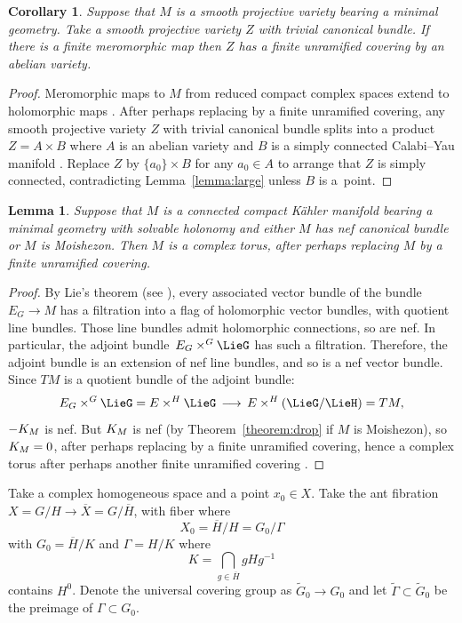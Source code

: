 \documentclass[11pt]{article}
\numberwithin{equation}{section}
\numberwithin{equation}{section}
\newtheorem{Corollary}[Theorem]{Corollary}
\newtheorem{Lemma}[Theorem]{Lemma}
\newcommand{\GZ}{G_0}
\newcommand{\tGZ}{\widetilde{G}_0}
\begin{document}
\begin{Corollary}\label{corollary:tori}
Suppose that $M$ is a smooth projective variety bearing a minimal geometry.
Take a smooth projective variety $Z$ with trivial canonical bundle.
If there is a finite meromorphic map  then $Z$ has a finite unramified covering by an abelian variety.
\end{Corollary}

\begin{proof}
Meromorphic maps to $M$ from reduced compact complex spaces extend to holomorphic maps \cite[Lemma 26]{Biswas.McKay:2016}.
After perhaps replacing by a finite unramified covering, any smooth projective variety $Z$ with trivial canonical bundle splits into a product $Z=A \times B$ where $A$ is an abelian variety and $B$ is a simply connected Calabi--Yau manifold \cite{Bogomolov:1974}.
Replace $Z$ by $\{a_0\} \times B$ for any $a_0 \in A$ to arrange that $Z$ is simply connected, contradicting
Lemma~\ref{lemma:large} unless $B$ is a~point.
\end{proof}

\begin{Lemma}\label{lemma:solvable.nef}
Suppose that $M$ is a connected compact K\"ahler manifold bearing a minimal geometry with solvable holonomy and either $M$ has nef canonical bundle or $M$ is Moishezon.
Then $M$ is a complex torus, after perhaps replacing $M$ by a finite unramified covering.
\end{Lemma}

\begin{proof}
By Lie's theorem (see \cite[Theorem 3]{Serre:2001}), every associated vector bundle of the bundle $E_G \to M$ has a filtration into a flag of holomorphic vector bundles, with quotient line bundles.
Those line bundles admit holomorphic connections, so are nef.
In particular, the adjoint bundle~$E_G \times^G \LieG$ has such a filtration.
Therefore, the adjoint bundle is an extension of nef line bundles, and so is a nef vector bundle.
Since $TM$ is a quotient bundle of the adjoint bundle:
\[
E_G \times^G \LieG = E \times^H \LieG \to E \times^H \pr{\LieG/\LieH} = TM,
\]
$\acb{M}$ is nef.
But $\cb{M}$ is nef (by Theorem~\ref{theorem:drop} if $M$ is Moishezon), so $\cb{M} = 0$, after perhaps replacing by a finite unramified covering, hence a complex torus after perhaps another finite unramified covering \cite{Biswas.McKay:2010}.
\end{proof}

Take a complex homogeneous space  and a point $x_0 \in X$.
Take the ant fibration $X = G/H \to \overline{X} = G/\overline{H}$, with fiber \pr{X_0,\GZ} where
\[
X_0 = \overline{H}/H = \GZ/\Gamma
\]
with $\GZ = \overline{H}/K$ and $\Gamma = H/K$ where
\[
K = \bigcap_{g\in\overline{H}} gHg^{-1}
\]
contains $H^0$.
Denote the universal covering group as $\tGZ \to \GZ$ and let $\widetilde{\Gamma} \subset \tGZ$ be the
preimage of $\Gamma \subset \GZ$.
\end{document}
